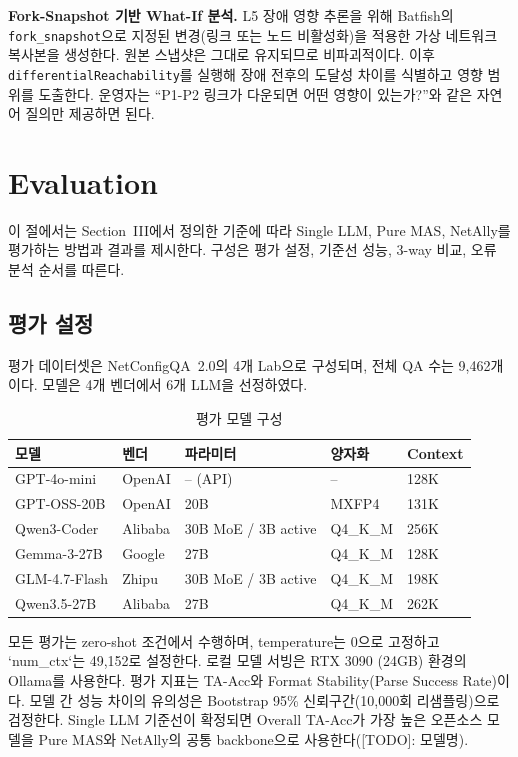 \documentclass[journal]{IEEEtran}
\begin{document}
\textbf{Fork-Snapshot 기반 What-If 분석.} L5 장애 영향 추론을 위해 Batfish의 \texttt{fork\_snapshot}으로 지정된 변경(링크 또는 노드 비활성화)을 적용한 가상 네트워크 복사본을 생성한다. 원본 스냅샷은 그대로 유지되므로 비파괴적이다. 이후 \texttt{differentialReachability}를 실행해 장애 전후의 도달성 차이를 식별하고 영향 범위를 도출한다. 운영자는 ``P1-P2 링크가 다운되면 어떤 영향이 있는가?''와 같은 자연어 질의만 제공하면 된다.

\section{Evaluation}
\noindent 이 절에서는 Section~III에서 정의한 기준에 따라 Single LLM, Pure MAS, NetAlly를 평가하는 방법과 결과를 제시한다. 구성은 평가 설정, 기준선 성능, 3-way 비교, 오류 분석 순서를 따른다.
\subsection{평가 설정}
평가 데이터셋은 NetConfigQA~2.0의 4개 Lab으로 구성되며, 전체 QA 수는 9,462개이다. 모델은 4개 벤더에서 6개 LLM을 선정하였다.

\begin{table}[!t]
  \caption{평가 모델 구성}
  \label{tab:model-setup}
  \centering
  \small
  \begin{tabular}{|L{2.6cm}|L{2.0cm}|L{3.0cm}|L{1.8cm}|C{1.5cm}|}
    \hline
    \textbf{모델}   & \textbf{벤더} & \textbf{파라미터}       & \textbf{양자화} & \textbf{Context} \\
    \hline
    GPT-4o-mini   & OpenAI      & -- (API)            & --           & 128K             \\
    \hline
    GPT-OSS-20B   & OpenAI      & 20B                 & MXFP4        & 131K             \\
    \hline
    Qwen3-Coder   & Alibaba     & 30B MoE / 3B active & Q4\_K\_M     & 256K             \\
    \hline
    Gemma-3-27B   & Google      & 27B                 & Q4\_K\_M     & 128K             \\
    \hline
    GLM-4.7-Flash & Zhipu       & 30B MoE / 3B active & Q4\_K\_M     & 198K             \\
    \hline
    Qwen3.5-27B   & Alibaba     & 27B                 & Q4\_K\_M     & 262K             \\
    \hline
  \end{tabular}
\end{table}

모든 평가는 zero-shot 조건에서 수행하며, temperature는 0으로 고정하고 `num\_ctx`는 49,152로 설정한다. 로컬 모델 서빙은 RTX 3090 (24GB) 환경의 Ollama를 사용한다. 평가 지표는 TA-Acc와 Format Stability(Parse Success Rate)이다. 모델 간 성능 차이의 유의성은 Bootstrap 95\% 신뢰구간(10,000회 리샘플링)으로 검정한다. Single LLM 기준선이 확정되면 Overall TA-Acc가 가장 높은 오픈소스 모델을 Pure MAS와 NetAlly의 공통 backbone으로 사용한다([TODO]: 모델명).
\end{document}
